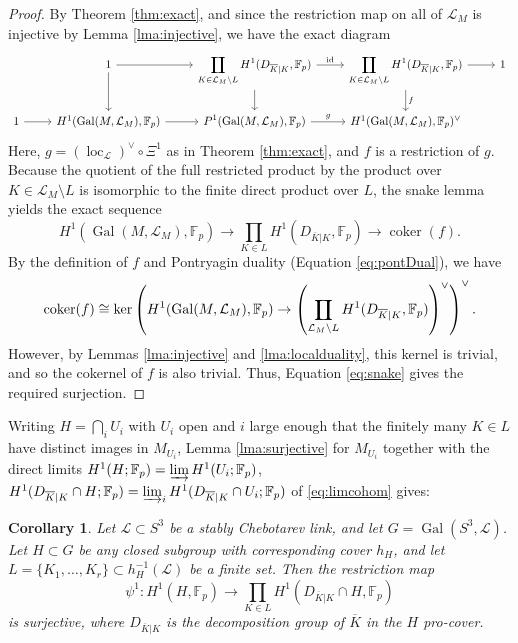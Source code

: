 \documentclass{amsart}
\theoremstyle{plain}
\theoremstyle{definition}
\theoremstyle{plain}
\theoremstyle{plain}
\newtheorem{corollary}[theorem]{Corollary}
\theoremstyle{plain}
\theoremstyle{remark}
\theoremstyle{remark}
\theoremstyle{plain}
\theoremstyle{definition}
\theoremstyle{plain}
\DeclareMathOperator{\Gal}{\mathrm{Gal}}
\DeclareMathOperator{\loc}{\mathrm{loc}}
\DeclareMathOperator{\coker}{\mathrm{coker}}
\theoremstyle{plain}
\theoremstyle{plain}
\def\doubleprod#1#2{\ooalign{$#1\prod$\cr$#1\coprod$\cr}}
\DeclareMathOperator*{\Rprod}{\mathpalette\doubleprod\relax}
\numberwithin{equation}{section}
\begin{document}
\begin{proof}
By Theorem \ref{thm:exact}, and since the restriction map on all of $\mathcal{L}_M$ is injective by Lemma \ref{lma:injective}, we have the exact diagram 
\[
\begin{tikzcd}
    & 1 
        \arrow[r]
        \arrow[d]
    & \displaystyle\Rprod_{K \in \mathcal{L}_M \setminus L} H^{1}(D_{\overline{K}|K}, \mathbb{F}_p)
        \arrow[r, "\text{id}"]
        \arrow[d]
    & \displaystyle\Rprod_{K \in \mathcal{L}_M \setminus L} H^{1}(D_{\overline{K}|K}, \mathbb{F}_p)
        \arrow[r]
        \arrow[d, "f"]
    & 1 \\
1 
    \arrow[r]
& H^{1}(\Gal(M, \mathcal{L}_M), \mathbb{F}_p) 
    \arrow[r]
& \displaystyle P^1(\Gal(M, \mathcal{L}_M), \mathbb{F}_p)
    \arrow[r, "g"]
& H^{1}(\Gal(M, \mathcal{L}_M), \mathbb{F}_p)^\vee
\end{tikzcd}
\]
Here, $g = (\loc_{\mathcal{L}})^\vee \circ \Xi^1$ as in Theorem \ref{thm:exact}, and $f$ is a restriction of $g$. Because the quotient of the full restricted product by the product over $K \in \mathcal{L}_M \setminus L$ is isomorphic to the finite direct product over $L$, the snake lemma yields the exact sequence 
\begin{equation}\label{eq:snake}
    H^1(\Gal(M, \mathcal{L}_M), \mathbb{F}_p) \to \prod_{K \in L}H^1(D_{\overline{K}|K}, \mathbb{F}_p) \to \coker(f).
\end{equation}
By the definition of $f$ and Pontryagin duality (Equation \ref{eq:pontDual}), we have 
\begin{equation}
    \coker(f) \cong \ker\left(H^1(\Gal(M, \mathcal{L}_M), \mathbb{F}_p) \to \left(\Rprod_{\mathcal{L}_M \setminus L}H^1(D_{\overline{K}|K}, \mathbb{F}_p)\right)^\vee\right)^\vee.
\end{equation}
However, by Lemmas \ref{lma:injective} and \ref{lma:localduality}, this kernel is trivial, and so the cokernel of $f$ is also trivial. Thus, Equation \ref{eq:snake} gives the required surjection.
\end{proof}

Writing $H = \bigcap_i U_i$ with $U_i$ open and $i$ large enough that the finitely many $K \in L$ have distinct images in $M_{U_i}$, Lemma \ref{lma:surjective} for $M_{U_i}$ together with the direct limits $H^1(H; \mathbb F_p) = \varinjlim H^1(U_i; \mathbb F_p)$, $H^1(D_{\overline K|K} \cap H; \mathbb F_p) = \varinjlim_iH^1(D_{\overline K|K} \cap U_i; \mathbb F_p)$ of \eqref{eq:limcohom} gives:

\begin{corollary}\label{cor:surjgeneral}
Let $\mathcal{L} \subset S^3$ be a stably Chebotarev link, and let $G = \Gal(S^3, \mathcal{L})$. Let $H \subset G$ be any closed subgroup with corresponding cover $h_H$, and let $L = \{K_1, \dots, K_r\} \subset h_H^{-1}(\mathcal{L})$ be a finite set. Then the restriction map
\begin{equation}
    \psi^1: H^1(H, \mathbb{F}_p) \to \prod_{K \in L}H^1(D_{\overline{K}|K} \cap H, \mathbb{F}_p)
\end{equation}
is surjective, where $D_{\overline{K}|K}$ is the decomposition group of $\overline{K}$ in the $H$ pro-cover. 
\end{corollary}
\end{document}
